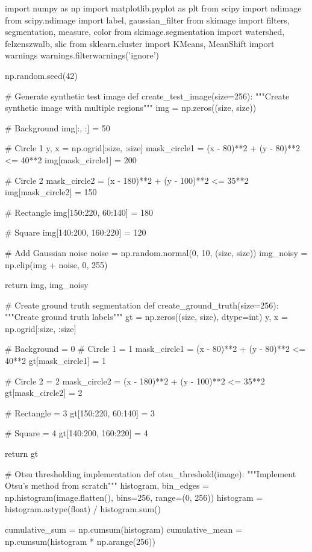 \documentclass[a4paper, 11pt]{article}
\begin{document}
\begin{pycode}
import numpy as np
import matplotlib.pyplot as plt
from scipy import ndimage
from scipy.ndimage import label, gaussian_filter
from skimage import filters, segmentation, measure, color
from skimage.segmentation import watershed, felzenszwalb, slic
from sklearn.cluster import KMeans, MeanShift
import warnings
warnings.filterwarnings('ignore')

np.random.seed(42)

# Generate synthetic test image
def create_test_image(size=256):
    """Create synthetic image with multiple regions"""
    img = np.zeros((size, size))

    # Background
    img[:, :] = 50

    # Circle 1
    y, x = np.ogrid[:size, :size]
    mask_circle1 = (x - 80)**2 + (y - 80)**2 <= 40**2
    img[mask_circle1] = 200

    # Circle 2
    mask_circle2 = (x - 180)**2 + (y - 100)**2 <= 35**2
    img[mask_circle2] = 150

    # Rectangle
    img[150:220, 60:140] = 180

    # Square
    img[140:200, 160:220] = 120

    # Add Gaussian noise
    noise = np.random.normal(0, 10, (size, size))
    img_noisy = np.clip(img + noise, 0, 255)

    return img, img_noisy

# Create ground truth segmentation
def create_ground_truth(size=256):
    """Create ground truth labels"""
    gt = np.zeros((size, size), dtype=int)
    y, x = np.ogrid[:size, :size]

    # Background = 0
    # Circle 1 = 1
    mask_circle1 = (x - 80)**2 + (y - 80)**2 <= 40**2
    gt[mask_circle1] = 1

    # Circle 2 = 2
    mask_circle2 = (x - 180)**2 + (y - 100)**2 <= 35**2
    gt[mask_circle2] = 2

    # Rectangle = 3
    gt[150:220, 60:140] = 3

    # Square = 4
    gt[140:200, 160:220] = 4

    return gt

# Otsu thresholding implementation
def otsu_threshold(image):
    """Implement Otsu's method from scratch"""
    histogram, bin_edges = np.histogram(image.flatten(), bins=256, range=(0, 256))
    histogram = histogram.astype(float) / histogram.sum()

    cumulative_sum = np.cumsum(histogram)
    cumulative_mean = np.cumsum(histogram * np.arange(256))


\end{pycode}
\end{document}

